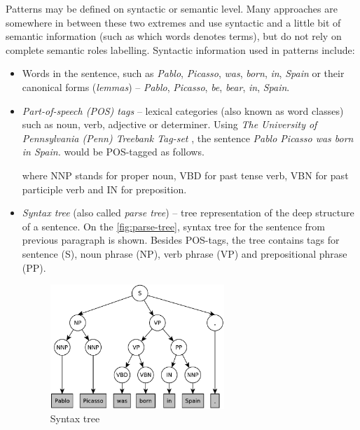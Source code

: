 \documentclass[12pt, twoside]{fithesis2}
\renewcommand{\_}{\leavevmode \kern0.07em\vbox{\hrule width0.4em}}
\newcommand{\squarebullet}{\textcolor{black}{\raisebox{0.15em}{\rule{4pt}{4pt}}}}
\newcommand{\emptysquarebullet}{\textcolor{black}{\raisebox{0.10em}{\tiny$\square$}}}
\newenvironment{myItemize}{
  \begin{itemize}[leftmargin=2em,rightmargin=1em,itemsep=\parskip ,parsep=0em,topsep=0em,partopsep=0em]
  \renewcommand{\labelitemi}{\squarebullet}
  \renewcommand{\labelitemii}{\textbullet}
}{
  \end{itemize}
}
\begin{document}
Patterns may be defined on syntactic or semantic level.
Many approaches are somewhere in between these two extremes and use syntactic and a little bit of semantic information (such as which words denotes terms), but do not rely on complete semantic roles labelling. Syntactic information used in patterns include:
\begin{myItemize}
  \item Words in the sentence, such as \emph{Pablo}, \emph{Picasso}, \emph{was}, \emph{born}, \emph{in}, \emph{Spain}
    or their canonical forms (\textit{lemmas}) -- \emph{Pablo}, \emph{Picasso}, \emph{be}, \emph{bear}, \emph{in}, \emph{Spain}.

  \item \textit{Part-of-speech (POS) tags} -- lexical categories (also known as word classes) such as noun, verb, adjective or determiner.
    Using \textit{The University of Pennsylvania (Penn) Treebank Tag-set} \cite{penn-tagset},
    the sentence \emph{Pablo Picasso was born in Spain.} would be POS-tagged as follows.
\begin{code}
\end{code}
    where NNP stands for proper noun, VBD for past tense verb, VBN for past participle verb and IN for preposition.

  \item \textit{Syntax tree} (also called \emph{parse tree}) -- tree representation of the deep structure of a sentence.
    On the \autoref{fig:parse-tree}, syntax tree for the sentence from previous paragraph is shown.
    Besides POS-tags, the tree contains tags for sentence (S), noun phrase (NP), verb phrase (VP) and prepositional phrase (PP).
  \begin{figure}[h]
    \centering
    \includegraphics[width=0.62\textwidth]{images/parse-tree.pdf}
    \caption{Syntax tree}
    \label{fig:parse-tree}
  \end{figure}
\end{myItemize}
\end{document}
